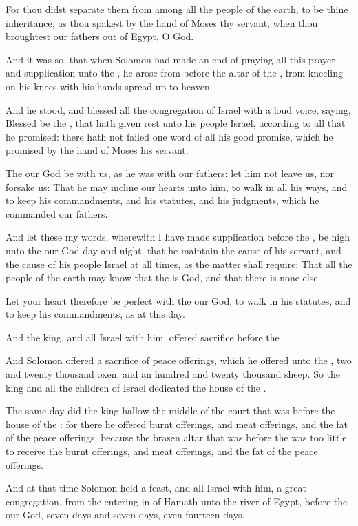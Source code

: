 \Verse For thou didst separate them from among all the people of the earth, to be thine inheritance, as thou spakest by the hand of Moses thy servant, when thou broughtest our fathers out of Egypt, O \LORD God.

\Verse And it was so, that when Solomon had made an end of praying all this prayer and supplication unto the \LORD, he arose from before the altar of the \LORD, from kneeling on his knees with his hands spread up to heaven.

\Verse And he stood, and blessed all the congregation of Israel with a loud voice, saying, \Verse Blessed be the \LORD, that hath given rest unto his people Israel, according to all that he promised: there hath not failed one word of all his good promise, which he promised by the hand of Moses his servant.

\Verse The \LORD our God be with us, as he was with our fathers: let him not leave us, nor forsake us: \Verse That he may incline our hearts unto him, to walk in all his ways, and to keep his commandments, and his statutes, and his judgments, which he commanded our fathers.

\Verse And let these my words, wherewith I have made supplication before the \LORD, be nigh unto the \LORD our God day and night, that he maintain the cause of his servant, and the cause of his people Israel at all times, as the matter shall require: \Verse That all the people of the earth may know that the \LORD is God, and that there is none else.

\Verse Let your heart therefore be perfect with the \LORD our God, to walk in his statutes, and to keep his commandments, as at this day.

\Verse And the king, and all Israel with him, offered sacrifice before the \LORD.

\Verse And Solomon offered a sacrifice of peace offerings, which he offered unto the \LORD, two and twenty thousand oxen, and an hundred and twenty thousand sheep. So the king and all the children of Israel dedicated the house of the \LORD.

\Verse The same day did the king hallow the middle of the court that was before the house of the \LORD: for there he offered burnt offerings, and meat offerings, and the fat of the peace offerings: because the brasen altar that was before the \LORD was too little to receive the burnt offerings, and meat offerings, and the fat of the peace offerings.

\Verse And at that time Solomon held a feast, and all Israel with him, a great congregation, from the entering in of Hamath unto the river of Egypt, before the \LORD our God, seven days and seven days, even fourteen days.

